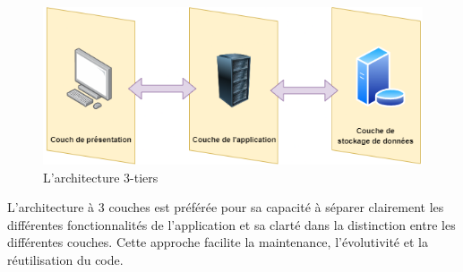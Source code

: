 \begin{figure}[H]
    \centering
    \includegraphics[width=\textwidth]{images/chp4/fig1.png}
    \caption{L’architecture 3-tiers}
    \label{fig:architecture-3-tiers}    
\end{figure}

L'architecture à 3 couches est préférée pour sa capacité à séparer clairement les différentes fonctionnalités de l'application et sa clarté dans la distinction entre les différentes couches. Cette approche facilite la maintenance, l'évolutivité et la réutilisation du code.

